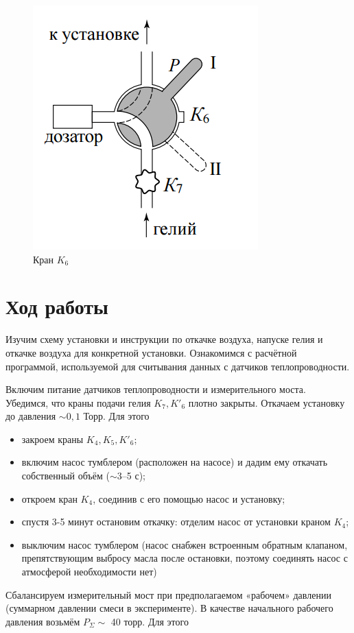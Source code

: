 \documentclass[a4paper, 12pt]{article} %
\begin{document}
\begin{figure}[h]
    \centering
    \includegraphics[width = 5.5 cm]{crane.png}
    \caption{Кран $K_6$}
    \label{fig:vac}
\end{figure} 

\section {Ход работы}

Изучим схему установки и инструкции по откачке воздуха, напуске гелия и откачке воздуха для конкретной установки. Ознакомимся с расчётной программой, используемой для считывания данных с датчиков теплопроводности. 

Включим питание датчиков теплопроводности и измерительного моста. Убедимся, что краны подачи гелия $K_7, K'_6$ плотно закрыты. Откачаем установку до давления $\sim 0,1$ Торр. Для этого

\begin{itemize}
\item закроем краны $K_4, K_5, K'_6$;
\item включим насос тумблером (расположен на насосе) и дадим ему откачать собственный объём ($\sim $3–5 с);
\item откроем кран $K_4$, соединив с его помощью насос и установку;
\item спустя 3-5 минут остановим откачку: отделим насос от установки краном $K_4$;
\item выключим насос тумблером (насос снабжен встроенным обратным клапаном, препятствующим выбросу масла после остановки, поэтому соединять насос с атмосферой необходимости нет)
\end{itemize}

Сбалансируем измерительный мост при предполагаемом «рабочем»
давлении (суммарном давлении смеси в эксперименте). В качестве начального рабочего давления возьмём $P_\Sigma \sim$ 40 торр. Для этого
\end{document}
